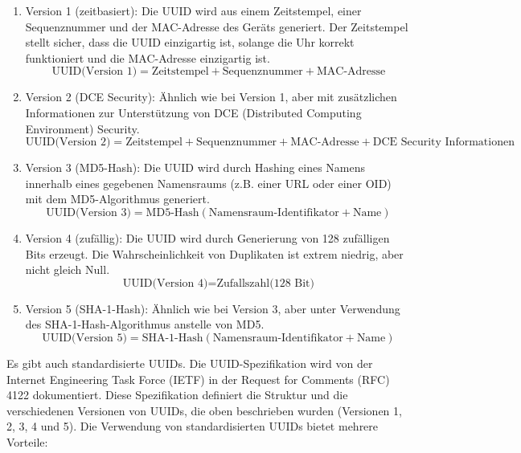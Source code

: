 \begin{enumerate}
    \item Version 1 (zeitbasiert): Die UUID wird aus einem Zeitstempel, einer Sequenznummer und der MAC-Adresse des Geräts generiert. Der Zeitstempel stellt sicher, dass die UUID einzigartig ist, solange die Uhr korrekt funktioniert und die MAC-Adresse einzigartig ist.
    \begin{equation}
        \text{UUID(Version 1)} = \text{Zeitstempel} + \text{Sequenznummer} + \text{MAC-Adresse}
    \end{equation}
    \item Version 2 (DCE Security): Ähnlich wie bei Version 1, aber mit zusätzlichen Informationen zur Unterstützung von DCE (Distributed Computing Environment) Security.
    \begin{equation}
        \text{UUID(Version 2)} = \text{Zeitstempel} + \text{Sequenznummer} + \text{MAC-Adresse} + \text{DCE Security Informationen}
    \end{equation}
    \item Version 3 (MD5-Hash): Die UUID wird durch Hashing eines Namens innerhalb eines gegebenen Namensraums (z.B. einer URL oder einer OID) mit dem MD5-Algorithmus generiert.
    \begin{equation}
        \text{UUID(Version 3)} = \text{MD5-Hash}(\text{Namensraum-Identifikator} + \text{Name})
    \end{equation}
    \item Version 4 (zufällig): Die UUID wird durch Generierung von 128 zufälligen Bits erzeugt. Die Wahrscheinlichkeit von Duplikaten ist extrem niedrig, aber nicht gleich Null.
    \begin{equation}
        \text{UUID(Version 4)} = \text{Zufallszahl(128 Bit)}
    \end{equation}
    \item Version 5 (SHA-1-Hash): Ähnlich wie bei Version 3, aber unter Verwendung des SHA-1-Hash-Algorithmus anstelle von MD5.
    \begin{equation}
        \text{UUID(Version 5)} = \text{SHA-1-Hash}(\text{Namensraum-Identifikator} + \text{Name})
    \end{equation}
\end{enumerate}
Es gibt auch standardisierte UUIDs. Die UUID-Spezifikation wird von der Internet Engineering Task Force (IETF) in der Request for Comments (RFC) 4122 dokumentiert. Diese Spezifikation definiert die Struktur und die verschiedenen Versionen von UUIDs, die oben beschrieben wurden (Versionen 1, 2, 3, 4 und 5). Die Verwendung von standardisierten UUIDs bietet mehrere Vorteile:
